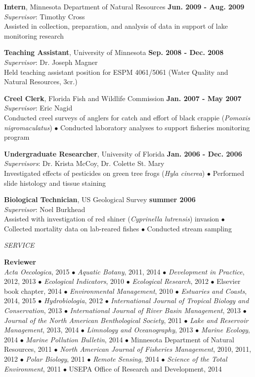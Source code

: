 \documentclass[letterpaper,12pt]{article}
\newcommand{\sectitle}[1]{\vspace{\baselineskip} \centerline{\large{\textit{#1}}}}
\begin{document}
{\bf Intern}, Minnesota Department of Natural Resources \hfill {\bf Jun. 2009 - Aug. 2009} \\
\textit{Supervisor}: Timothy Cross \\
Assisted in collection, preparation, and analysis of data in support of lake monitoring research

{\bf Teaching Assistant}, University of Minnesota \hfill {\bf Sep. 2008 - Dec. 2008} \\
\textit{Supervisor}: Dr. Joseph Magner \\
Held teaching assistant position for ESPM 4061/5061 (Water Quality and Natural Resources, 3cr.)

{\bf Creel Clerk}, Florida Fish and Wildlife Commission \hfill {\bf Jan. 2007 - May 2007} \\
\textit{Supervisor}: Eric Nagid \\
Conducted creel surveys of anglers for catch and effort of black crappie (\textit{Pomoxis nigromaculatus}) $\bullet$ Conducted laboratory analyses to support fisheries monitoring program

{\bf Undergraduate Researcher}, University of Florida \hfill {\bf Jan. 2006 - Dec. 2006} \\
\textit{Supervisors}: Dr. Krista McCoy, Dr. Colette St. Mary \\
Investigated effects of pesticides on green tree frogs (\textit{Hyla cinerea}) $\bullet$ Performed slide histology and tissue staining

{\bf Biological Technician}, US Geological Survey \hfill {\bf summer 2006} \\
\textit{Supervisor}: Noel Burkhead \\
Assisted with investigation of red shiner (\textit{Cyprinella lutrensis}) invasion $\bullet$ Collected mortality data on lab-reared fishes $\bullet$ Conducted stream sampling

\sectitle{SERVICE}

{\bf Reviewer}\hfill \\
\textit{Acta Oecologica}, 2015 $\bullet$ \textit{Aquatic Botany}, 2011, 2014 $\bullet$ \textit{Development in Practice}, 2012, 2013 $\bullet$ \textit{Ecological Indicators}, 2010 $\bullet$ \textit{Ecological Research}, 2012 $\bullet$ Elsevier book chapter, 2014 $\bullet$ \textit{Environmental Management}, 2010 $\bullet$ \textit{Estuaries and Coasts}, 2014, 2015 $\bullet$ \textit{Hydrobiologia}, 2012 $\bullet$ \textit{International Journal of Tropical Biology and Conservation}, 2013 $\bullet$ \textit{International Journal of River Basin Management}, 2013 $\bullet$ \textit{Journal of the North American Benthological Society}, 2011 $\bullet$ \textit{Lake and Reservoir Management}, 2013, 2014 $\bullet$ \textit{Limnology and Oceanography}, 2013 $\bullet$ \textit{Marine Ecology}, 2014 $\bullet$ \textit{Marine Pollution Bulletin}, 2014 $\bullet$ Minnesota Department of Natural Resources, 2011 $\bullet$ \textit{North American Journal of Fisheries Management}, 2010, 2011, 2012 $\bullet$ \textit{Polar Biology}, 2011 $\bullet$ \textit{Remote Sensing}, 2014 $\bullet$ \textit{Science of the Total Environment}, 2011 $\bullet$ USEPA Office of Research and Development, 2014
\end{document}
